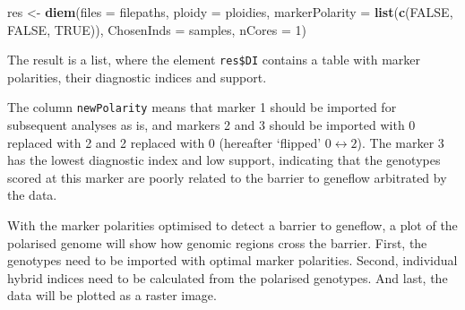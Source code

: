 \documentclass[
]{book}
\newenvironment{Shaded}{\begin{snugshade}}{\end{snugshade}}
\newcommand{\AttributeTok}[1]{\textcolor[rgb]{0.13,0.29,0.53}{#1}}
\newcommand{\CommentTok}[1]{\textcolor[rgb]{0.56,0.35,0.01}{\textit{#1}}}
\newcommand{\ConstantTok}[1]{\textcolor[rgb]{0.56,0.35,0.01}{#1}}
\newcommand{\DecValTok}[1]{\textcolor[rgb]{0.00,0.00,0.81}{#1}}
\newcommand{\FunctionTok}[1]{\textcolor[rgb]{0.13,0.29,0.53}{\textbf{#1}}}
\newcommand{\NormalTok}[1]{#1}
\newcommand{\OtherTok}[1]{\textcolor[rgb]{0.56,0.35,0.01}{#1}}
\newcommand{\SpecialCharTok}[1]{\textcolor[rgb]{0.81,0.36,0.00}{\textbf{#1}}}
\begin{document}
\begin{Shaded}
\begin{Highlighting}[]
\NormalTok{res }\OtherTok{\textless{}{-}} \FunctionTok{diem}\NormalTok{(}\AttributeTok{files =}\NormalTok{ filepaths, }
            \AttributeTok{ploidy =}\NormalTok{ ploidies, }
            \AttributeTok{markerPolarity =} \FunctionTok{list}\NormalTok{(}\FunctionTok{c}\NormalTok{(}\ConstantTok{FALSE}\NormalTok{, }\ConstantTok{FALSE}\NormalTok{, }\ConstantTok{TRUE}\NormalTok{)),}
            \AttributeTok{ChosenInds =}\NormalTok{ samples, }
            \AttributeTok{nCores =} \DecValTok{1}\NormalTok{)}
\end{Highlighting}
\end{Shaded}

The result is a list, where the element \texttt{res\$DI} contains a table with marker
polarities, their diagnostic indices and support.

\begin{Shaded}
\end{Shaded}

The column \texttt{newPolarity} means that marker 1 should be imported for subsequent
analyses as is, and markers 2 and 3 should be imported with 0 replaced with 2 and 2
replaced with 0 (hereafter `flipped' \(0 \leftrightarrow 2\)). The marker 3 has the lowest diagnostic
index and low support, indicating
that the genotypes scored at this marker are poorly related to the barrier to geneflow
arbitrated by the data.

With the marker polarities optimised to detect a barrier to geneflow, a plot of the
polarised genome will show how genomic regions cross the barrier. First, the genotypes
need to be imported with optimal marker polarities. Second, individual hybrid indices
need to be calculated from the polarised genotypes. And last, the data will be plotted
as a raster image.

\begin{Shaded}
\end{Shaded}
\end{document}
